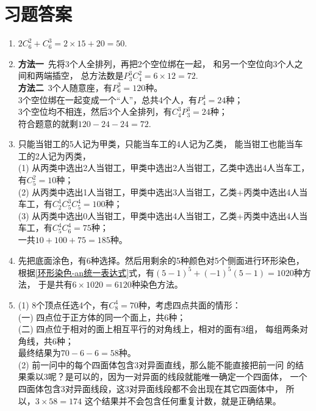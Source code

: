 \section{习题答案}
\begin{enumerate}[label={\textbf{\thechapter.\arabic*}},leftmargin=
    \inteval{\myenumleftmargin}pt]
\item $ 2C_6^2+C_6^3=2\times 15+20=50 $.

\item \textbf{方法一}\ 先将3个人全排列，再把2个空位绑在一起，
和另一个空位向3个人之间和两端插空，
总方法数是$P_3^3 C_4^2=6\times 12 =72$.  \\
\textbf{方法二}\ 3个人随意座，有$ P_6^3=120 $种。\\
3个空位绑在一起变成一个“人”，总共4个人，有$P_4^4=24$种；\\
3个空位均不相连，然后3个人全排列，有$C_4^3P_3^3=24$种；\\
符合题意的就剩$ 120-24-24=72$.

\item 只能当钳工的5人记为甲类，只能当车工的4人记为乙类，
能当钳工也能当车工的2人记为丙类，\\
(1) 从丙类中选出2人当钳工，甲类中选出2人当钳工，乙类中选出4人当车工，有$ C_5^2=10 $种；\\
(2) 从丙类中选出1人当钳工，甲类中选出3人当钳工，乙类+丙类中选出4人当车工，有$ C_2^1C_5^3C_5^4=100 $种；\\
(3) 从丙类中选出0人当钳工，甲类中选出4人当钳工，乙类+丙类中选出4人当车工，有$ C_5^4C_6^4=75 $种；\\
一共$10+100+75=185$种。

\item 先把底面涂色，有6种选择。然后用剩余的5种颜色对5个侧面进行环形染色，
根据\eqref{环形染色-an统一表达式}式，有$(5-1)^5+(-1)^5(5-1)=1020$种方法，
于是共有$6\times 1020=6120$种染色方法。

\item (1) 8个顶点任选4个，有$C_8^4=70$种，考虑四点共面的情形：\\
(一) 四点位于正方体的同一个面上，共6种；\\
(二) 四点位于相对的面上相互平行的对角线上，相对的面有3组，
每组两条对角线，共6种；\\
最终结果为$70-6-6=58$种。\\
(2) 前一问中的每个四面体包含3对异面直线，那么能不能直接把前一问
的结果乘以3呢？是可以的，因为一对异面的线段就能唯一确定一个四面体，
一个四面体包含3对异面线段，这3对异面线段都不会出现在其它四面体中，
所以，$3\times 58=174$
这个结果并不会包含任何重复计数，就是正确结果。



\end{enumerate}
